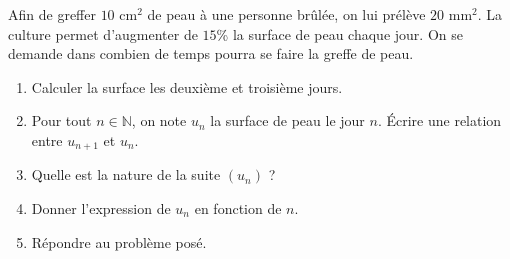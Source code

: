 \documentclass[11pt]{article}
\begin{document}
\begin{exo}
  Afin de greffer $10$ cm$^2$ de peau à une personne brûlée, on lui prélève $20$
  mm$^2$. La culture permet d'augmenter de $15$\% la surface de peau chaque
  jour. On se demande dans combien de temps pourra se faire la greffe de peau.
  \begin{enumerate}
    \item Calculer la surface les deuxième et troisième jours.
    \item Pour tout $n\in\mathbb{N}$, on note $u_n$ la surface de peau le jour
      $n$. Écrire une relation entre $u_{n+1}$ et $u_n$.
    \item Quelle est la nature de la suite $\left( u_n \right)$ ?
    \item Donner l'expression de $u_n$ en fonction de $n$.
    \item Répondre au problème posé.
  \end{enumerate}
\end{exo}
\end{document}
